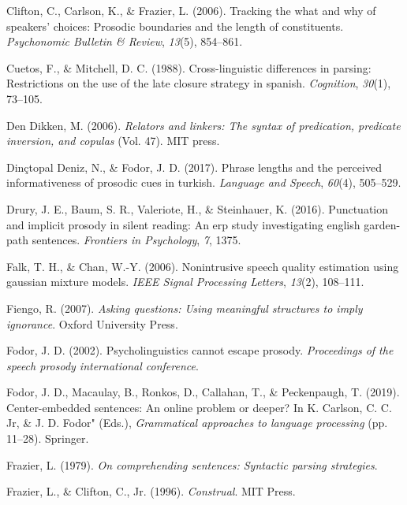 \documentclass[11pt,oneside]{book}
\begin{document}
\leavevmode\hypertarget{ref-lengthCCFL}{}%
Clifton, C., Carlson, K., \& Frazier, L. (2006). Tracking the what and why of speakers' choices: Prosodic boundaries and the length of constituents. \emph{Psychonomic Bulletin \& Review}, \emph{13}(5), 854--861.

\leavevmode\hypertarget{ref-Cuetos1988-tm}{}%
Cuetos, F., \& Mitchell, D. C. (1988). Cross-linguistic differences in parsing: Restrictions on the use of the late closure strategy in spanish. \emph{Cognition}, \emph{30}(1), 73--105.

\leavevmode\hypertarget{ref-den2006relators}{}%
Den Dikken, M. (2006). \emph{Relators and linkers: The syntax of predication, predicate inversion, and copulas} (Vol. 47). MIT press.

\leavevmode\hypertarget{ref-nazik}{}%
Dinçtopal Deniz, N., \& Fodor, J. D. (2017). Phrase lengths and the perceived informativeness of prosodic cues in turkish. \emph{Language and Speech}, \emph{60}(4), 505--529.

\leavevmode\hypertarget{ref-cps}{}%
Drury, J. E., Baum, S. R., Valeriote, H., \& Steinhauer, K. (2016). Punctuation and implicit prosody in silent reading: An erp study investigating english garden-path sentences. \emph{Frontiers in Psychology}, \emph{7}, 1375.

\leavevmode\hypertarget{ref-gmm1}{}%
Falk, T. H., \& Chan, W.-Y. (2006). Nonintrusive speech quality estimation using gaussian mixture models. \emph{IEEE Signal Processing Letters}, \emph{13}(2), 108--111.

\leavevmode\hypertarget{ref-fiengo}{}%
Fiengo, R. (2007). \emph{Asking questions: Using meaningful structures to imply ignorance}. Oxford University Press.

\leavevmode\hypertarget{ref-Fodor2002-io}{}%
Fodor, J. D. (2002). Psycholinguistics cannot escape prosody. \emph{Proceedings of the speech prosody international conference}.

\leavevmode\hypertarget{ref-fodor2019center}{}%
Fodor, J. D., Macaulay, B., Ronkos, D., Callahan, T., \& Peckenpaugh, T. (2019). Center-embedded sentences: An online problem or deeper? In K. Carlson, C. C. Jr, \& J. D. Fodor" (Eds.), \emph{Grammatical approaches to language processing} (pp. 11--28). Springer.

\leavevmode\hypertarget{ref-Frazier1979-pb}{}%
Frazier, L. (1979). \emph{On comprehending sentences: Syntactic parsing strategies}.

\leavevmode\hypertarget{ref-frazier1996construal}{}%
Frazier, L., \& Clifton, C., Jr. (1996). \emph{Construal}. MIT Press.
\end{document}

